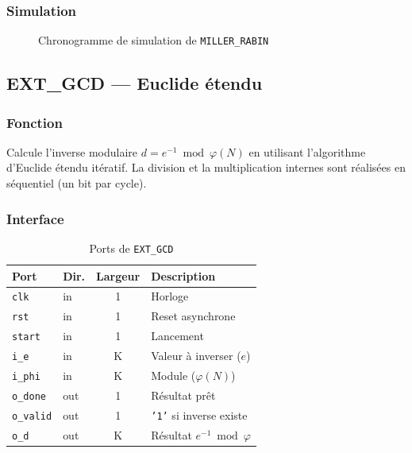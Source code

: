 \documentclass[12pt,a4paper]{report}
\begin{document}
\subsubsection{Simulation}
\begin{figure}[H]
\centering
{}
\caption{Chronogramme de simulation de \texttt{MILLER\_RABIN}}
\label{fig:sim_mr}
\end{figure}

\subsection{EXT\_GCD --- Euclide étendu}
\label{sec:gcd}

\subsubsection{Fonction}
Calcule l'inverse modulaire $d = e^{-1} \bmod \varphi(N)$ en utilisant
l'algorithme d'Euclide étendu itératif. La division et la multiplication
internes sont réalisées en séquentiel (un bit par cycle).

\subsubsection{Interface}
\begin{table}[H]
\centering
\caption{Ports de \texttt{EXT\_GCD}}
\begin{tabular}{llcp{5cm}}
\toprule
\textbf{Port} & \textbf{Dir.} & \textbf{Largeur} & \textbf{Description} \\
\midrule
\texttt{clk}     & in  & 1 & Horloge \\
\texttt{rst}     & in  & 1 & Reset asynchrone \\
\texttt{start}   & in  & 1 & Lancement \\
\texttt{i\_e}    & in  & K & Valeur à inverser ($e$) \\
\texttt{i\_phi}  & in  & K & Module ($\varphi(N)$) \\
\texttt{o\_done}  & out & 1 & Résultat prêt \\
\texttt{o\_valid} & out & 1 & \texttt{'1'} si inverse existe \\
\texttt{o\_d}     & out & K & Résultat $e^{-1} \bmod \varphi$ \\
\bottomrule
\end{tabular}
\end{table}
\end{document}
